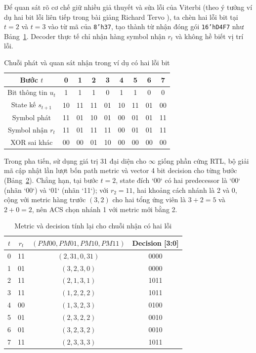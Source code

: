 \documentclass[12pt,a4paper]{article}
\DeclareRobustCommand{\code}[1]{\texttt{#1}}
\renewcommand{\_}{\originalunderscore\allowbreak}
\begin{document}
Để quan sát rõ cơ chế giữ nhiều giả thuyết và sửa lỗi của Viterbi (theo ý tưởng ví dụ hai bit lỗi liên tiếp trong bài giảng Richard Tervo \cite{tervo-viterbi}), ta chèn hai lỗi bit tại $t=2$ và $t=3$ vào từ mã của \code{8'h37}, tạo thành từ nhận đóng gói \code{16'hD4F7} như Bảng~\ref{tab:theory-channel}. Decoder thực tế chỉ nhận hàng symbol nhận $r_t$ và không hề biết vị trí lỗi.

\begin{table}[H]\centering\small
\begin{tabular}{c*{8}{c}}\toprule
\textbf{Bước $t$}&0&1&2&3&4&5&6&7\\\midrule
Bit thông tin $u_t$&1&1&1&0&1&1&0&0\\
State kế $s_{t+1}$&10&11&11&01&10&11&01&00\\
Symbol phát&11&01&10&01&00&01&01&11\\
Symbol nhận $r_t$&11&01&11&11&00&01&01&11\\
XOR sai khác&00&00&01&10&00&00&00&00\\\bottomrule
\end{tabular}
\caption{Chuỗi phát và quan sát nhận trong ví dụ có hai lỗi bit}\label{tab:theory-channel}
\end{table}

Trong pha tiến, sử dụng giá trị 31 đại diện cho $\infty$ giống phần cứng RTL, bộ giải mã cập nhật lần lượt bốn path metric và vector 4 bit decision cho từng bước (Bảng~\ref{tab:theory-noisy}). Chẳng hạn, tại bước $t=2$, state đích `00` có hai predecessor là `00` (nhãn `00`) và `01` (nhãn `11`); với $r_2=11$, hai khoảng cách nhánh là 2 và 0, cộng với metric hàng trước $(3,2)$ cho hai tổng ứng viên là $3+2=5$ và $2+0=2$, nên ACS chọn nhánh 1 với metric mới bằng 2.

\begin{table}[H]\centering\small
\begin{tabular}{cccc}\toprule
\textbf{$t$}&\textbf{$r_t$}&\textbf{$(PM00,PM01,PM10,PM11)$}&\textbf{Decision [3:0]}\\\midrule
0&11&$(2,31,0,31)$&0000\\
1&01&$(3,2,3,0)$&0000\\
2&11&$(2,1,3,1)$&1011\\
3&11&$(1,2,2,2)$&1011\\
4&00&$(1,3,2,3)$&0100\\
5&01&$(2,3,2,2)$&0010\\
6&01&$(3,2,3,2)$&0010\\
7&11&$(2,3,3,3)$&1011\\
\bottomrule\end{tabular}
\caption{Metric và decision tính lại cho chuỗi nhận có hai lỗi}\label{tab:theory-noisy}
\end{table}
\end{document}
